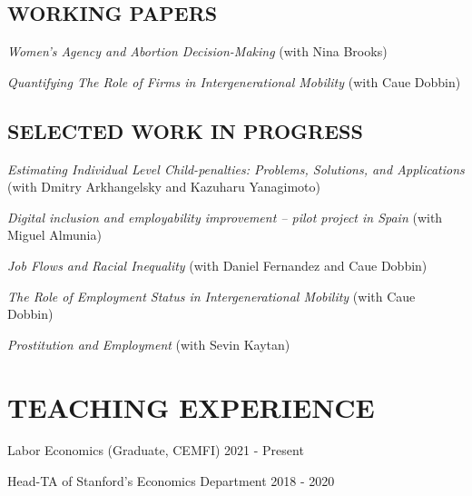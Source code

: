 \documentclass[margin]{res} %
\newcommand{\rootFolder}{/Users/tomzohar/Dropbox/}
\begin{document}
\begin{resume}
\subsection{WORKING PAPERS}

\textit{Women's Agency and Abortion Decision-Making} (with Nina Brooks) 

%

\textit{Quantifying The Role of Firms in Intergenerational Mobility} (with Caue Dobbin) 

\subsection{SELECTED WORK IN PROGRESS}

\textit{Estimating Individual Level Child-penalties: Problems, Solutions, and Applications} (with Dmitry Arkhangelsky and Kazuharu Yanagimoto)

\textit{Digital inclusion and employability improvement -- pilot project in Spain} (with Miguel Almunia) 

\textit{Job Flows and Racial Inequality} (with Daniel Fernandez and Caue Dobbin) 

\textit{The Role of Employment Status in Intergenerational Mobility} (with Caue Dobbin) 


\textit{Prostitution and Employment} (with Sevin Kaytan)



\section{TEACHING EXPERIENCE}

Labor Economics (Graduate, CEMFI) \hfill 2021 - Present

Head-TA of Stanford's Economics Department \hfill 2018 - 2020


\end{resume}
\end{document}
